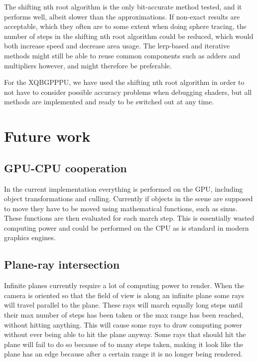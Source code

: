 		The shifting nth root algorithm is the only bit-accurate method tested,
		and it performs well, albeit slower than the approximations. If
		non-exact results are acceptable, which they often are to some extent
		when doing sphere tracing, the number of steps in the shifting nth root
		algorithm could be reduced, which would both increase speed and
		decrease area usage. The lerp-based and iterative methods might still
		be able to reuse common components such as adders and multipliers
		however, and might therefore be preferable.
		
		For the XQBGPPPU, we have used the shifting nth root algorithm in order
		to not have to consider possible accuracy problems when debugging
		shaders, but all methods are implemented and ready to be switched out
		at any time.

	\section{Future work}

		\subsection{GPU-CPU cooperation}

			In the current implementation everything is performed on the GPU,
			including object transformations and culling. Currently if objects
			in the scene are supposed to move they have to be moved using
			mathematical functions, such as sinus. These functions are then
			evaluated for each march step. This is essentially wasted computing
			power and could be performed on the CPU as is standard in modern
			graphics engines.

		\subsection{Plane-ray intersection}

			Infinite planes currently require a lot of computing power to
			render. When the camera is oriented so that the field of view is
			along an infinite plane some rays will travel parallel to the
			plane. These rays will march equally long steps until their max
			number of steps has been taken or the max range has been reached, 
			without hitting anything. This will cause some rays to draw 
			computing power without ever being able to hit the plane anyway. 
			Some rays that should hit the plane will fail to do so because of 
			to many steps taken, making it look like the plane has an edge 
			because after a certain range it is no longer being rendered.

